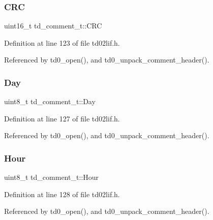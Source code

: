 \subsubsection{\texorpdfstring{C\+RC}{CRC}}
{\footnotesize\ttfamily uint16\+\_\+t td\+\_\+comment\+\_\+t\+::\+C\+RC}



Definition at line 123 of file td02lif.\+h.



Referenced by td0\+\_\+open(), and td0\+\_\+unpack\+\_\+comment\+\_\+header().

\mbox{\label{structtd__comment__t_ab42475ed36aa4475f76336099fd53acc}} 
\subsubsection{\texorpdfstring{Day}{Day}}
{\footnotesize\ttfamily uint8\+\_\+t td\+\_\+comment\+\_\+t\+::\+Day}



Definition at line 127 of file td02lif.\+h.



Referenced by td0\+\_\+open(), and td0\+\_\+unpack\+\_\+comment\+\_\+header().

\mbox{\label{structtd__comment__t_ae42f4895a24dadba8528e32d89d601c6}} 
\subsubsection{\texorpdfstring{Hour}{Hour}}
{\footnotesize\ttfamily uint8\+\_\+t td\+\_\+comment\+\_\+t\+::\+Hour}



Definition at line 128 of file td02lif.\+h.



Referenced by td0\+\_\+open(), and td0\+\_\+unpack\+\_\+comment\+\_\+header().

\mbox{\label{structtd__comment__t_a40d01b0af51b4896e0d771e8a458ed87}} 
